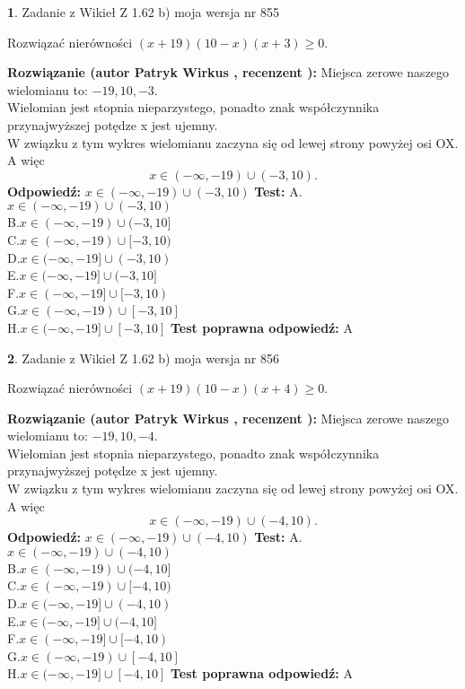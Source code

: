 \documentclass[12pt, a4paper]{article}
\theoremstyle{definition} %
\newtheorem{zad}{}
\newcommand{\zadStart}[1]{\begin{zad}#1\newline}
\newcommand{\zadStop}{\end{zad}}
\newcommand{\rozwStart}[2]{\noindent \textbf{Rozwiązanie (autor #1 , recenzent #2): }\newline}
\newcommand{\rozwStop}{\newline}
\newcommand{\odpStart}{\noindent \textbf{Odpowiedź:}\newline}
\newcommand{\odpStop}{\newline}
\newcommand{\testStart}{\noindent \textbf{Test:}\newline}
\newcommand{\testStop}{\newline}
\newcommand{\kluczStart}{\noindent \textbf{Test poprawna odpowiedź:}\newline}
\newcommand{\kluczStop}{\newline}
\begin{document}
\zadStart{Zadanie z Wikieł Z 1.62 b) moja wersja nr 855}

Rozwiązać nierówności $(x+19)(10-x)(x+3)\ge0$.
\zadStop
\rozwStart{Patryk Wirkus}{}
Miejsca zerowe naszego wielomianu to: $-19, 10, -3$.\\
Wielomian jest stopnia nieparzystego, ponadto znak współczynnika przy\linebreak najwyższej potędze x jest ujemny.\\ W związku z tym wykres wielomianu zaczyna się od lewej strony powyżej osi OX. A więc $$x \in (-\infty,-19) \cup (-3,10).$$
\rozwStop
\odpStart
$x \in (-\infty,-19) \cup (-3,10)$
\odpStop
\testStart
A.$x \in (-\infty,-19) \cup (-3,10)$\\
B.$x \in (-\infty,-19) \cup (-3,10]$\\
C.$x \in (-\infty,-19) \cup [-3,10)$\\
D.$x \in (-\infty,-19] \cup (-3,10)$\\
E.$x \in (-\infty,-19] \cup (-3,10]$\\
F.$x \in (-\infty,-19] \cup [-3,10)$\\
G.$x \in (-\infty,-19) \cup [-3,10]$\\
H.$x \in (-\infty,-19] \cup [-3,10]$
\testStop
\kluczStart
A
\kluczStop



\zadStart{Zadanie z Wikieł Z 1.62 b) moja wersja nr 856}

Rozwiązać nierówności $(x+19)(10-x)(x+4)\ge0$.
\zadStop
\rozwStart{Patryk Wirkus}{}
Miejsca zerowe naszego wielomianu to: $-19, 10, -4$.\\
Wielomian jest stopnia nieparzystego, ponadto znak współczynnika przy\linebreak najwyższej potędze x jest ujemny.\\ W związku z tym wykres wielomianu zaczyna się od lewej strony powyżej osi OX. A więc $$x \in (-\infty,-19) \cup (-4,10).$$
\rozwStop
\odpStart
$x \in (-\infty,-19) \cup (-4,10)$
\odpStop
\testStart
A.$x \in (-\infty,-19) \cup (-4,10)$\\
B.$x \in (-\infty,-19) \cup (-4,10]$\\
C.$x \in (-\infty,-19) \cup [-4,10)$\\
D.$x \in (-\infty,-19] \cup (-4,10)$\\
E.$x \in (-\infty,-19] \cup (-4,10]$\\
F.$x \in (-\infty,-19] \cup [-4,10)$\\
G.$x \in (-\infty,-19) \cup [-4,10]$\\
H.$x \in (-\infty,-19] \cup [-4,10]$
\testStop
\kluczStart
A
\kluczStop
\end{document}
